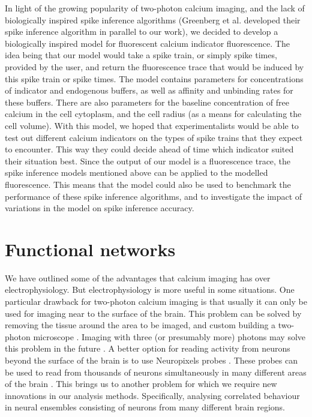 In light of the growing popularity of two-photon calcium imaging, and the lack of biologically inspired spike inference algorithms (Greenberg et al. developed their spike inference algorithm in parallel to our work), we decided to develop a biologically inspired model for fluorescent calcium indicator fluorescence. The idea being that our model would take a spike train, or simply spike times, provided by the user, and return the fluorescence trace that would be induced by this spike train or spike times. The model contains parameters for concentrations of indicator and endogenous buffers, as well as affinity and unbinding rates for these buffers. There are also parameters for the baseline concentration of free calcium in the cell cytoplasm, and the cell radius (as a means for calculating the cell volume). With this model, we hoped that experimentalists would be able to test out different calcium indicators on the types of spike trains that they expect to encounter. This way they could decide ahead of time which indicator suited their situation best. Since the output of our model is a fluorescence trace, the spike inference models mentioned above can be applied to the modelled fluorescence. This means that the model could also be used to benchmark the performance of these spike inference algorithms, and to investigate the impact of variations in the model on spike inference accuracy.

\section{Functional networks}

We have outlined some of the advantages that calcium imaging has over electrophysiology. But electrophysiology is more useful in some situations. One particular drawback for two-photon calcium imaging is that usually it can only be used for imaging near to the surface of the brain. This problem can be solved by removing the tissue around the area to be imaged, and custom building a two-photon microscope \cite{dombeck}. Imaging with three (or presumably more) photons may solve this problem in the future \parencite{ouzounov}. A better option for reading activity from neurons beyond the surface of the brain is to use Neuropixels probes \parencite{jun}. These probes can be used to read from thousands of neurons simultaneously in many different areas of the brain \parencite{allen, stringer, steinmetz, steinmetz2019}. This brings us to another problem for which we require new innovations in our analysis methods. Specifically, analysing correlated behaviour in neural ensembles consisting of neurons from many different brain regions.

